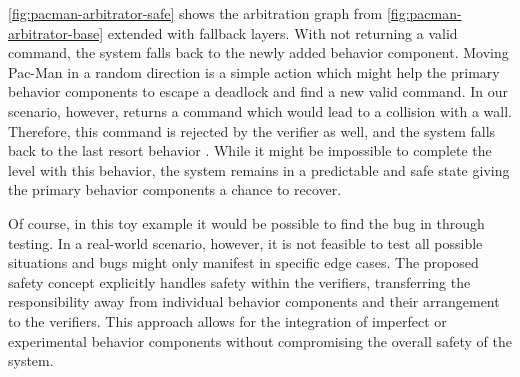 \cref{fig:pacman-arbitrator-safe} shows the arbitration graph from \cref{fig:pacman-arbitrator-base} extended with fallback layers.
With  not returning a valid command, the system falls back to the newly added  behavior component.
Moving Pac-Man in a random direction is a simple action which might help the primary behavior components to escape a deadlock and find a new valid command.
In our scenario, however,  returns a command which would lead to a collision with a wall.
Therefore, this command is rejected by the verifier as well, and the system falls back to the last resort behavior .
While it might be impossible to complete the level with this behavior, the system remains in a predictable and safe state giving the primary behavior components a chance to recover.

Of course, in this toy example it would be possible to find the bug in  through testing.
In a real-world scenario, however, it is not feasible to test all possible situations and bugs might only manifest in specific edge cases.
The proposed safety concept explicitly handles safety within the verifiers, transferring the responsibility away from individual behavior components and their arrangement to the verifiers.
This approach allows for the integration of imperfect or experimental behavior components without compromising the overall safety of the system.

